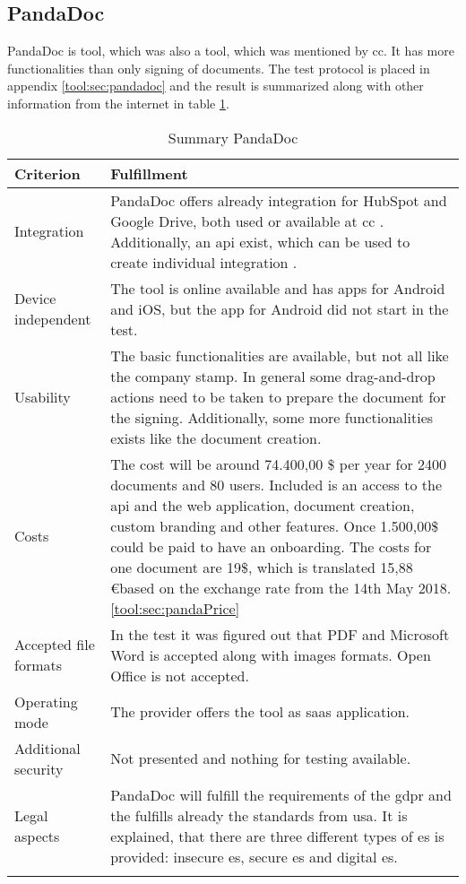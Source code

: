 \subsection{PandaDoc}
PandaDoc is tool, which was also a tool, which was mentioned by \gls{cc}. It has more functionalities than only signing of documents. The test protocol is placed in appendix \ref{tool:sec:pandadoc} and the result is summarized along with other information from the internet in table \ref{tool:tab:pandadoc}. 
	\begin{longtable}{|p{4cm}|p{10cm}|} \hline
		\rowcolor{Gray}Criterion & Fulfillment \\ \hline
		Integration & PandaDoc offers already integration for HubSpot and Google Drive, both used or available at \gls{cc} \parencite{pandadoc2018integration}. Additionally, an \gls{api} exist, which can be used to create individual integration \parencite{pandadoc2018api}. \\ \hline
		Device independent & The tool is online available and has \glspl{app} for Android and iOS, but the \gls{app} for Android did not start in the test. \\ \hline
		Usability & The basic functionalities are available, but not all like the company stamp. In general some drag-and-drop actions need to be taken to prepare the document for the signing. Additionally, some more functionalities exists like the document creation.\\ \hline
		Costs & The cost will be around 74.400,00 \$ per year for 2400 documents and 80 users. Included is an access to the \gls{api} and the web application, document creation, custom branding and other features. Once 1.500,00\$ could be paid to have an onboarding. The costs for one document are 19\$, which is translated 15,88 \euro based on the exchange rate from the 14th May 2018. \ref{tool:sec:pandaPrice} \\ \hline
		Accepted file formats & In the test it was figured out that \gls{PDF} and Microsoft Word is accepted along with images formats. Open Office is not accepted. \\ \hline
		Operating mode & The provider offers the tool as \gls{saas} application. \parencite{pandadoc2018saas} \\ \hline
		Additional security & Not presented and nothing for testing available. \\ \hline
		Legal aspects & PandaDoc will fulfill the requirements of the \gls{gdpr} and the fulfills already the standards from \gls{usa}. It is explained, that there are three different types of \gls{es} is provided: insecure \gls{es}, secure \gls{es} and digital \gls{es}.  \parencite{pandadoc2018gdpr,pandadoc2018legal} \\ \hline
	\caption{Summary PandaDoc}
	\label{tool:tab:pandadoc}
	\end{longtable}

